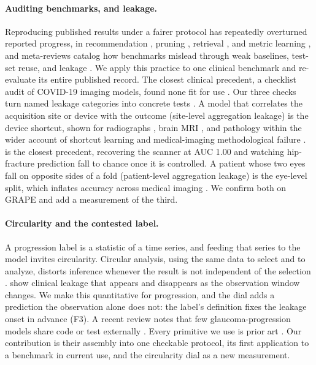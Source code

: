 \paragraph{Auditing benchmarks, and leakage.} Reproducing published results under a fairer protocol has repeatedly
overturned reported progress, in recommendation \citep{dacrema2019progress}, pruning \citep{blalock2020pruning},
retrieval \citep{yang2019hype}, and metric learning \citep{musgrave2020metric}, and meta-reviews catalog how benchmarks
mislead through weak baselines, test-set reuse, and leakage \citep{liao2021learning, raji2021benchmark,
dehghani2021lottery}. We apply this practice to one clinical benchmark and re-evaluate its entire published record. The
closest clinical precedent, a checklist audit of COVID-19 imaging models, found none fit for use
\citep{roberts2021pitfalls}. Our three checks turn named leakage categories into concrete tests
\citep{kapoor2023leakage, davis2023leakage}. A model that correlates the acquisition site or device with the outcome
(site-level aggregation leakage) is the device shortcut, shown for radiographs \citep{badgeley2019confound, zech2018,
degrave2021}, brain MRI \citep{glocker2019scanner}, and pathology \citep{dehkharghanian2023site} within the wider
account of shortcut learning and medical-imaging methodological failure \citep{geirhos2020, oakdenrayner2020stratification,
varoquaux2022pitfalls}. \citet{badgeley2019confound} is the closest precedent, recovering the
scanner at AUC \num{1.00} and watching hip-fracture prediction fall to chance once it is controlled. A patient whose two
eyes fall on opposite sides of a fold (patient-level aggregation leakage) is the eye-level split, which inflates accuracy
across medical imaging \citep{tampu2022leakage, yagis2021leakage}. We confirm both on GRAPE and add a measurement of the
third.

\paragraph{Circularity and the contested label.} A progression label is a statistic of a time series, and feeding that
series to the model invites circularity. Circular analysis, using the same data to select and to analyze, distorts
inference whenever the result is not independent of the selection \citep{kriegeskorte2009circular}. \citet{ramadan2025leakage}
show clinical leakage that appears and disappears as the observation window changes. We make this quantitative for
progression, and the dial adds a prediction the observation alone does not: the label's definition fixes the leakage
onset in advance (F3). A recent review notes that few glaucoma-progression models share code or test externally
\citep{liang2026review}. Every primitive we use is prior art \citep{diciccio1996bootstrap}. Our contribution is their
assembly into one checkable protocol, its first application to a benchmark in current use, and the circularity dial as a
new measurement.

